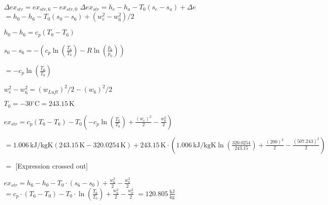 \( \Delta ex_{str} = ex_{str,6} - ex_{str,0} \)  
\( \Delta ex_{str} = h_e - h_a - T_0 (s_e - s_a) + \Delta e \)  
\( = h_0 - h_6 - T_0 (s_0 - s_6) + (w_e^2 - w_6^2)/2 \)  

\( h_0 - h_6 = c_p (T_0 - T_6) \)  

\( s_0 - s_6 = - \left( c_p \ln \left( \frac{T_6}{T_0} \right) - R \ln \left( \frac{p_6}{p_0} \right) \right) \)  

\( = - c_p \ln \left( \frac{T_6}{T_0} \right) \)  

\( w_e^2 - w_6^2 = (w_{Luft})^2 / 2 - (w_6)^2 / 2 \)  

\( T_0 = -30^\circ \text{C} = 243.15 \, \text{K} \)  

\( ex_{str} = c_p (T_0 - T_6) - T_0 \left( - c_p \ln \left( \frac{T_6}{T_0} \right) + \frac{(w_e)^2}{2} - \frac{w_6^2}{2} \right) \)  

\( = 1.006 \, \text{kJ/kgK} (243.15 \, \text{K} - 320.0254 \, \text{K}) + 243.15 \, \text{K} \cdot (1.006 \, \text{kJ/kgK} \ln \left( \frac{320.0254}{243.15} \right) + \frac{(200)^2}{2} - \frac{(507.243)^2}{2}) \)  

\( = \) [Expression crossed out]

\( ex_{str} = h_6 - h_0 - T_0 \cdot (s_6 - s_0) + \frac{w_6^2}{2} - \frac{w_0^2}{2} \)  
\( = c_p \cdot (T_6 - T_0) - T_0 \cdot \ln \left( \frac{T_6}{T_0} \right) + \frac{w_6^2}{2} - \frac{w_0^2}{2} \)  
\( = 120.805 \, \frac{\text{kJ}}{\text{kg}} \)